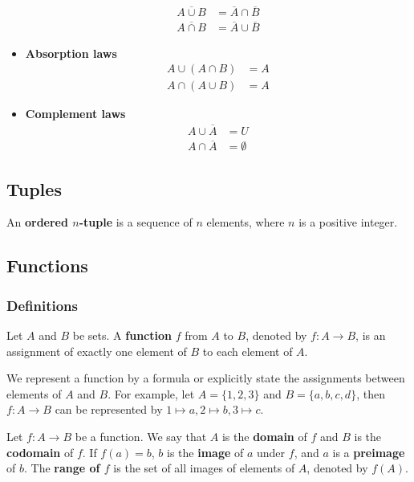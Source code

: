 \documentclass[a4paper,12pt]{article}
\begin{document}
\begin{itemize}
		\begin{align*}
			\overline{A \cup B} &= \overline{A} \cap \overline{B} \\
			\overline{A \cap B} &= \overline{A} \cup \overline{B}
		\end{align*}
	\item \textbf{Absorption laws}
		\begin{align*}
			A \cup (A \cap B) &= A \\
			A \cap (A \cup B) &= A
		\end{align*}
	\item \textbf{Complement laws}
		\begin{align*}
			A \cup \overline{A} &= U \\
			A \cap \overline{A} &= \emptyset
		\end{align*}
\end{itemize}

\subsection{Tuples}

An \textbf{ordered $n$-tuple} is a sequence of $n$ elements, where $n$ is a positive integer.

\subsection{Functions}

\subsubsection{Definitions}

Let $A$ and $B$ be sets. 
A \textbf{function} $f$ from $A$ to $B$, denoted by $f: A \rightarrow B$, is an assignment of exactly one element of $B$ to each element of $A$.

We represent a function by a formula or explicitly state the assignments between elements of $A$ and $B$.
For example, let $A = \{1,2,3\}$ and $B = \{a,b,c,d\}$, then $f: A \rightarrow B$ can be represented by $1 \mapsto a, 2 \mapsto b, 3 \mapsto c$.

Let $f: A \rightarrow B$ be a function. We say that $A$ is the \textbf{domain} of $f$ and $B$ is the \textbf{codomain} of $f$.
If $f(a) = b$, $b$ is the \textbf{image} of $a$ under $f$, and $a$ is a \textbf{preimage} of $b$.
The \textbf{range of $f$} is the set of all images of elements of $A$, denoted by $f(A)$.
\end{document}
